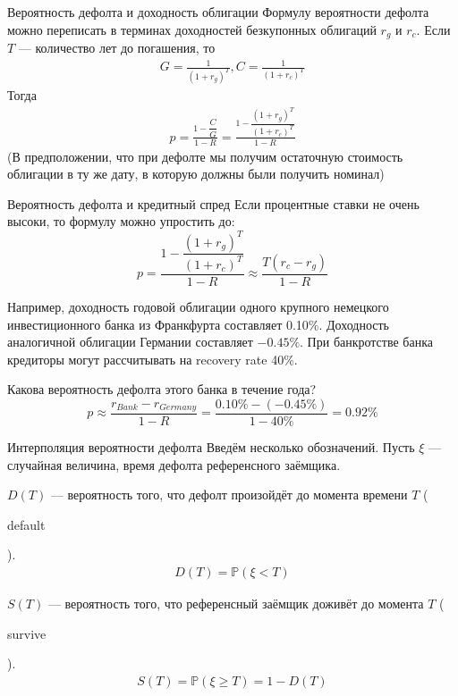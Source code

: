 \documentclass{beamer}
\newcommand{\en}[1]{\begin{otherlanguage}{english}#1\end{otherlanguage}}
\begin{document}
\begin{frame}{Вероятность дефолта и доходность облигации}
\justify
Формулу вероятности дефолта можно переписать в терминах доходностей безкупонных облигаций $r_g$ и $r_c$. Если $T$ --- количество лет до погашения, то
\begin{align*}
G = \frac{1}{(1 + r_g)^T}, C = \frac{1}{(1 + r_c)^T}
\end{align*}
Тогда
\begin{align*}
p = \frac{1 - \dfrac{C}{G}}{1-R} = \frac{1 - \dfrac{(1 + r_g)^T}{(1 + r_c)^T}}{1 - R}
\end{align*}
(В предположении, что при дефолте мы получим остаточную стоимость облигации в ту же дату, в которую должны были получить номинал)
\end{frame}



\begin{frame}{Вероятность дефолта и кредитный спред}
\justify
Если процентные ставки не очень высоки, то формулу можно упростить до:
\begin{equation*}
p = \frac{1 - \dfrac{(1 + r_g)^T}{(1 + r_c)^T}}{1 - R} \approx \frac{T(r_c - r_g)}{1 - R}
\end{equation*}

\justify
Например, доходность годовой облигации одного крупного немецкого инвестиционного банка из Франкфурта составляет 0.10\%. Доходность аналогичной облигации Германии составляет $-0.45\%$. При банкротстве банка кредиторы могут рассчитывать на recovery rate 40\%.

\justify
Какова вероятность дефолта этого банка в течение года?
\begin{equation*}
p \approx \frac{r_{Bank} - r_{Germany}}{1-R} = \frac{0.10\% - (-0.45\%)}{1-40\%} = 0.92\%
\end{equation*}
\end{frame}



\begin{frame}{Интерполяция вероятности дефолта}
\justify
Введём несколько обозначений. Пусть $\xi$ --- случайная величина, время дефолта референсного заёмщика.

\justify
$D(T)$ --- вероятность того, что дефолт произойдёт до момента времени $T$ (\en{default}).
\begin{align*}
D(T) = \mathbb{P}(\xi < T)
\end{align*}

\justify
$S(T)$ --- вероятность того, что референсный заёмщик доживёт до момента $T$ (\en{survive}).
\begin{align*}
S(T) = \mathbb{P}(\xi \ge T) = 1 - D(T)
\end{align*}
\end{frame}
\end{document}
